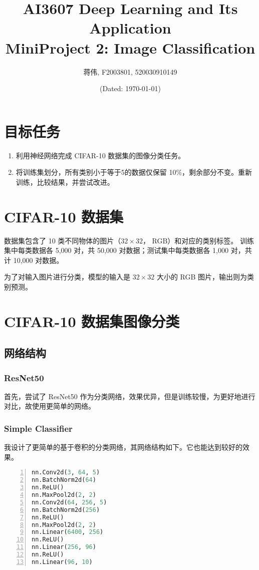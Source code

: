\documentclass[a4paper]{article}
\title{AI3607 Deep Learning and Its Application\\MiniProject 2: Image Classification}
\author{\sffamily 蒋伟, F2003801, 520030910149}
\date{(Dated: \today)}
\begin{document}
\section{目标任务}
\begin{enumerate}
    \item 利用神经网络完成 CIFAR-10 数据集的图像分类任务。
    \item 将训练集划分，所有类别小于等于5的数据仅保留 10\%，剩余部分不变。重新训练，比较结果，并尝试改进。
\end{enumerate}

\section{CIFAR-10 数据集}
数据集包含了 10 类不同物体的图片（$32\times 32$， RGB）和对应的类别标签。
训练集中每类数据各 5,000 对，共 50,000 对数据；测试集中每类数据各 1,000 对，共计 10,000 对数据。

为了对输入图片进行分类，模型的输入是 $32\times 32$ 大小的 RGB 图片，输出则为类别预测。

\section{CIFAR-10 数据集图像分类}
\subsection{网络结构}
\subsubsection{ResNet50}
首先，尝试了 ResNet50 \cite{resnet} 作为分类网络，效果优异，但是训练较慢，为更好地进行对比，故使用更简单的网络。
\subsubsection{Simple Classifier}
我设计了更简单的基于卷积的分类网络，其网络结构如下。它也能达到较好的效果。

\begin{multicols}{2}
    \begin{lstlisting}[language=Python, basicstyle=\ttfamily, numbers=left]
nn.Conv2d(3, 64, 5)
nn.BatchNorm2d(64)
nn.ReLU()
nn.MaxPool2d(2, 2)
nn.Conv2d(64, 256, 5)
nn.BatchNorm2d(256)
nn.ReLU()
nn.MaxPool2d(2, 2)
nn.Linear(6400, 256)
nn.ReLU()
nn.Linear(256, 96)
nn.ReLU()
nn.Linear(96, 10)
    \end{lstlisting}
\end{multicols}
\end{document}
